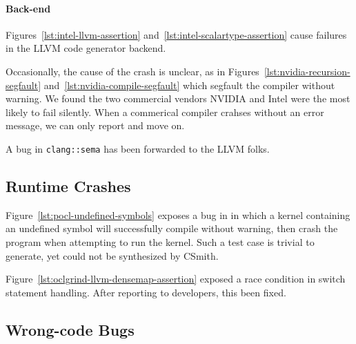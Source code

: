 \paragraph{Back-end} Figures~\ref{lst:intel-llvm-assertion} and~\ref{lst:intel-scalartype-assertion} cause failures in the LLVM code generator backend.

Occasionally, the cause of the crash is unclear, as in Figures~\ref{lst:nvidia-recursion-segfault} and~\ref{lst:nvidia-compile-segfault} which segfault the compiler without warning. We found the two commercial vendors NVIDIA and Intel were the most likely to fail silently. When a commerical compiler crahses without an error message, we can only report and move on.

A bug in \texttt{clang::sema} has been forwarded to the LLVM folks.



\subsection{Runtime Crashes}

Figure~\ref{lst:pocl-undefined-symbols} exposes a bug in in which a kernel containing an undefined symbol will successfully compile without warning, then crash the program when attempting to run the kernel. Such a test case is trivial to generate, yet could not be synthesized by CSmith.

Figure~\ref{lst:oclgrind-llvm-densemap-assertion} exposed a race condition in switch statement handling. After reporting to developers, this been fixed.



\subsection{Wrong-code Bugs}

